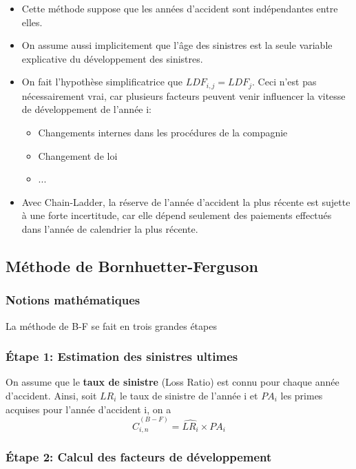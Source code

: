 \documentclass[11pt,french]{report}
\begin{document}
\begin{itemize}
\item Cette méthode suppose que les années d'accident sont indépendantes entre elles.
\item On assume aussi implicitement que l'âge des sinistres est la seule variable explicative du développement des sinistres.
\item On fait l'hypothèse simplificatrice que $LDF_{i,j}=LDF_j$. Ceci n'est pas nécessairement vrai, car plusieurs facteurs peuvent venir influencer la vitesse de développement de l'année i:
	\begin{itemize}
	\item Changements internes dans les procédures de la compagnie
	\item Changement de loi
	\item ...
	\end{itemize}
\item Avec Chain-Ladder, la réserve de l'année d'accident la plus récente est sujette à une forte incertitude, car elle dépend seulement des paiements effectués dans l'année de calendrier la plus récente.
\end{itemize}


\subsection*{Méthode de Bornhuetter-Ferguson}

\subsubsection*{Notions mathématiques}

La méthode de B-F se fait en trois grandes étapes

\subsubsection*{ Étape 1: Estimation des sinistres ultimes}

On assume que le \textbf{taux de sinistre} (Loss Ratio) est connu pour chaque année d'accident. Ainsi, soit $LR_i$ le taux de sinistre de l'année i et $PA_i$ les primes acquises pour l'année d'accident i, on a
$$\boxed{\widehat{C}_{i,n}^{(B-F)}=\widehat{LR_i} \times PA_i}$$

\subsubsection*{ Étape 2: Calcul des facteurs de développement }
\end{document}
